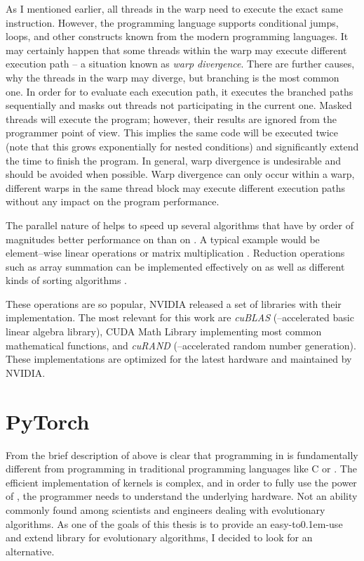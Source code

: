 As I mentioned earlier, all threads in the warp need to execute the exact same instruction. However, the programming language supports conditional jumps, loops, and other constructs known from the modern programming languages. It may certainly happen that some threads within the warp may execute different execution path -- a situation known as \emph{warp divergence}. There are further causes, why the threads in the warp may diverge, but branching is the most common one. In order for \gpu to evaluate each execution path, it executes the branched paths sequentially and masks out threads not participating in the current one. Masked threads will execute the program; however, their results are ignored from the programmer point of view. This implies the same code will be executed twice (note that this grows exponentially for nested conditions) and significantly extend the time to finish the program. In general, warp divergence is undesirable and should be avoided when possible.
Warp divergence can only occur within a warp, different warps in the same thread block may execute different execution paths without any impact on the program performance.

The parallel nature of \cuda helps to speed up several algorithms that have by order of magnitudes better performance on \gpu than on \cpuns. A typical example would be element--wise linear operations or matrix multiplication \citep{GPUMatrixMultiplication}. Reduction operations such as array summation can be implemented effectively on \gpu \citep{harris2007optimizing} as well as different kinds of sorting algorithms \citep{GPUsorting}.

These operations are so popular, NVIDIA released a set of libraries with their implementation. The most relevant for this work are \textit{cuBLAS} (\gpuns--accelerated basic linear algebra library), CUDA Math Library implementing most common mathematical functions, and \textit{cuRAND} (\cpuns--accelerated random number generation). These implementations are optimized for the latest hardware and maintained by NVIDIA.




\section{PyTorch}

From the brief description of \cuda above is clear that programming in \cuda is fundamentally different from programming in traditional programming languages like C or \cppns. The efficient implementation of kernels is complex, and in order to fully use the power of \gpuns, the programmer needs to understand the underlying hardware. Not an ability commonly found among scientists and engineers dealing with evolutionary algorithms. As one of the goals of this thesis is to provide an easy-to\kern0.1em-use and extend library for evolutionary algorithms, I decided to look for an alternative.

